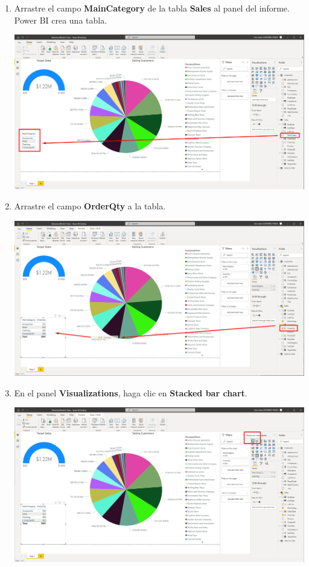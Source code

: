 \documentclass[12pt,letterpaper]{article}
\newcommand\tab[1][1cm]{\hspace*{#1}}
\begin{document}
\begin{enumerate}[\tab 1.]
\begin{center}
        \end{center}
        \item Arrastre el campo \textbf{MainCategory} de la tabla \textbf{Sales} al panel del informe. Power BI crea una tabla.
        \begin{center}
            \includegraphics[width=13cm]{./img/img89.png}
        \end{center}
        \item Arrastre el campo \textbf{OrderQty} a la tabla.
        \begin{center}
            \includegraphics[width=13cm]{./img/img90.png}
        \end{center}
        \item En el panel \textbf{Visualizations}, haga clic en \textbf{Stacked bar chart}.
        \begin{center}
            \includegraphics[width=13cm]{./img/img91.png}

\end{center}
\end{enumerate}
\end{document}
